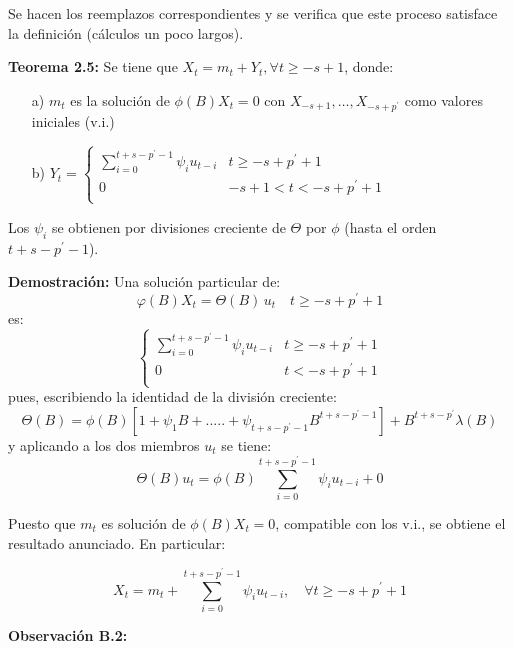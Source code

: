 Se hacen los reemplazos correspondientes y se verifica que este proceso satisface la definici\'{o}n (c\'{a}lculos un poco largos).\newline

\textbf{Teorema 2.5:} Se tiene que $X_{t}=m_{t}+Y_{t}, \forall t\geq -s+1$, donde: 

\begin{enumerate}
      \item[a)] $m_{t}$ es la soluci\'{o}n de $\phi (B)X_{t} =0$ con $X_{-s+1},\ldots, X_{-s+p^{'}}$ como valores iniciales (v.i.)
      \item[b)] $Y_{t} =\left\{ {\begin{array}{ll}
 \displaystyle\sum_{i=0}^{t+s-p^{'}-1} \psi_{i} u_{t-i} & t\geq -s+p^{'}+1 \\ 
 0 & -s+1<t<-s+p^{'}+1 \\ 
 \end{array}} \right.$
\end{enumerate}

Los $\psi_{i}$ se obtienen por divisiones creciente de $\Theta$ por $\phi$ (hasta el orden $t+s-p^{'}-1$).\newline

\textbf{Demostraci\'{o}n: }Una soluci\'{o}n particular de:
\[
\varphi \left( B \right)X_{t} =\Theta \left( B \right)\,u_{t} \quad t\geq -s+p^{'}+1
\]
es:
\[
\left\{ {\begin{array}{ll}
 \displaystyle\sum_{i=0}^{t+s-p^{'}-1} {\psi_{i} u_{t-i} } & t\geq -s+p^{'}+1 \\ 
 0 & t<-s+p^{'}+1 \\ 
 \end{array}} \right.
\]
pues, escribiendo la identidad de la divisi\'{o}n creciente:
\[
\Theta (B)=\phi (B)\left[ {1+\psi_{1} B+.....+\psi_{t+s-p^{'}-1} B^{t+s-p^{'}-1}} \right]+B^{t+s-p^{'}}\lambda \left( B \right)
\]
y aplicando a los dos miembros $u_{t}$ se tiene:
\[
\Theta (B)u_{t} =\phi (B)\sum_{i=0}^{t+s-p^{'}-1} {\psi_{i} u_{t-i} +0} 
\]

Puesto que $m_{t}$ es soluci\'{o}n de $\phi (B)X_{t}=0$, compatible con los v.i., se obtiene el resultado anunciado. En particular:

\[
X_{t} =m_{t} +\sum_{i=0}^{t+s-p^{'}-1} {\psi_{i} u_{t-i} },\quad \forall t\geq -s+p^{'}+1
\]

\textbf{Observaci\'{o}n B.2:}

